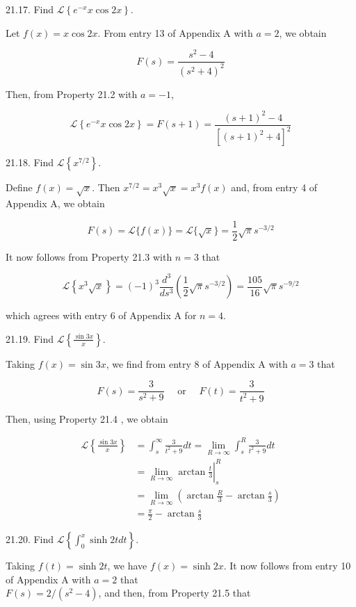 \documentclass[10pt]{article}
\begin{document}
21.17. Find $\mathscr{L}\left\{e^{-x} x \cos 2 x\right\}$.

Let $f(x)=x \cos 2 x$. From entry 13 of Appendix A with $a=2$, we obtain

$$
F(s)=\frac{s^{2}-4}{\left(s^{2}+4\right)^{2}}
$$

Then, from Property 21.2 with $a=-1$,

$$
\mathscr{L}\left\{e^{-x} x \cos 2 x\right\}=F(s+1)=\frac{(s+1)^{2}-4}{\left[(s+1)^{2}+4\right]^{2}}
$$

21.18. Find $\mathscr{L}\left\{x^{7 / 2}\right\}$.

Define $f(x)=\sqrt{x}$. Then $x^{7 / 2}=x^{3} \sqrt{x}=x^{3} f(x)$ and, from entry 4 of Appendix A, we obtain

$$
F(s)=\mathscr{L}\{f(x)\}=\mathscr{L}\{\sqrt{x}\}=\frac{1}{2} \sqrt{\pi} s^{-3 / 2}
$$

It now follows from Property 21.3 with $n=3$ that

$$
\mathscr{L}\left\{x^{3} \sqrt{x}\right\}=(-1)^{3} \frac{d^{3}}{d s^{3}}\left(\frac{1}{2} \sqrt{\pi} s^{-3 / 2}\right)=\frac{105}{16} \sqrt{\pi} s^{-9 / 2}
$$

which agrees with entry 6 of Appendix A for $n=4$.

21.19. Find $\mathscr{L}\left\{\frac{\sin 3 x}{x}\right\}$.

Taking $f(x)=\sin 3 x$, we find from entry 8 of Appendix A with $a=3$ that

$$
F(s)=\frac{3}{s^{2}+9} \quad \text { or } \quad F(t)=\frac{3}{t^{2}+9}
$$

Then, using Property 21.4 , we obtain

$$
\begin{aligned}
\mathscr{L}\left\{\frac{\sin 3 x}{x}\right\} & =\int_{s}^{\infty} \frac{3}{t^{2}+9} d t=\lim _{R \rightarrow \infty} \int_{s}^{R} \frac{3}{t^{2}+9} d t \\
& =\left.\lim _{R \rightarrow \infty} \arctan \frac{t}{3}\right|_{s} ^{R} \\
& =\lim _{R \rightarrow \infty}\left(\arctan \frac{R}{3}-\arctan \frac{s}{3}\right) \\
& =\frac{\pi}{2}-\arctan \frac{s}{3}
\end{aligned}
$$

21.20. Find $\mathscr{L}\left\{\int_{0}^{x} \sinh 2 t d t\right\}$.

Taking $f(t)=\sinh 2 t$, we have $f(x)=\sinh 2 x$. It now follows from entry 10 of Appendix A with $a=2$ that\\
$F(s)=2 /\left(s^{2}-4\right)$, and then, from Property 21.5 that
\end{document}
